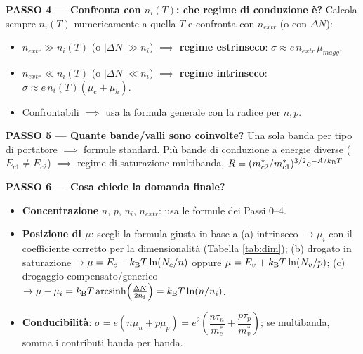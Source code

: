\textbf{PASSO 4 --- Confronta con $n_i(T)$: che regime di conduzione è?}
Calcola sempre $n_i(T)$ numericamente a quella $T$ e confronta con $n_{extr}$ (o con $\Delta N$):
\begin{itemize}
  \item $n_{extr}\gg n_i(T)$ (o $|\Delta N|\gg n_i$) $\implies$ \textbf{regime estrinseco}: $\sigma\approx e\,n_{extr}\,\mu_{magg}$.
  \item $n_{extr}\ll n_i(T)$ (o $|\Delta N|\ll n_i$) $\implies$ \textbf{regime intrinseco}: $\sigma\approx e\,n_i(T)(\mu_e+\mu_h)$.
  \item Confrontabili $\implies$ usa la formula generale con la radice per $n,p$.
\end{itemize}

\textbf{PASSO 5 --- Quante bande/valli sono coinvolte?}
Una sola banda per tipo di portatore $\implies$ formule standard. Più bande di conduzione a energie diverse ($E_{c1}\neq E_{c2}$) $\implies$ regime di saturazione multibanda, $R=(m_{c2}^*/m_{c1}^*)^{3/2}e^{-A/k_{\mathrm{B}} T}$ 

\textbf{PASSO 6 --- Cosa chiede la domanda finale?}
\begin{itemize}
  \item \textbf{Concentrazione} $n$, $p$, $n_i$, $n_{extr}$: usa le formule dei Passi 0--4.
  \item \textbf{Posizione di $\mu$}: scegli la formula giusta in base a
  (a) intrinseco $\to\mu_i$ con il coefficiente corretto per la dimensionalità (Tabella \ref{tab:dim});
  (b) drogato in saturazione $\to\mu=E_c-k_{\mathrm{B}} T\ln(N_c/n)$ oppure $\mu=E_v+k_{\mathrm{B}} T\ln(N_v/p)$;
  (c) drogaggio compensato/generico $\to\mu-\mu_i=k_{\mathrm{B}} T\,\mathrm{arcsinh}\!\left(\frac{\Delta N}{2n_i}\right)=k_{\mathrm{B}} T\ln(n/n_i)$.
  \item \textbf{Conducibilità}: $\sigma=e(n\mu_n+p\mu_p)=e^2\!\left(\dfrac{n\tau_n}{m_c^*}+\dfrac{p\tau_p}{m_v^*}\right)$; se multibanda, somma i contributi banda per banda.
\end{itemize}



